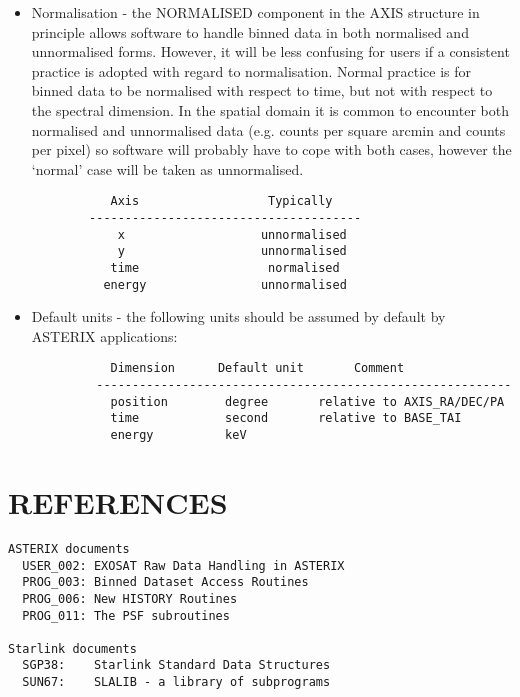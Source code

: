 \begin{itemize}
\item
Normalisation  -  the  NORMALISED  component  in   the   AXIS
structure  in principle allows software to handle binned data
in both normalised and unnormalised forms.  However, it  will
be  less  confusing  for  users  if  a consistent practice is
adopted with regard to normalisation.  Normal practice is for
binned  data  to  be normalised with respect to time, but not
with respect to  the  spectral  dimension.   In  the  spatial
domain   it  is  common  to  encounter  both  normalised  and
unnormalised data (e.g.  counts per square arcmin and  counts
per  pixel)  so software will probably have to cope with both
cases,  however  the  `normal'  case   will   be   taken   as
unnormalised.

\begin{verbatim}
           Axis                  Typically
        --------------------------------------
            x                   unnormalised
            y                   unnormalised
           time                  normalised
          energy                unnormalised
\end{verbatim}

\item
Default units - the following  units  should  be  assumed  by
default by ASTERIX applications:

\begin{verbatim}
           Dimension      Default unit       Comment
         ----------------------------------------------------------
           position        degree       relative to AXIS_RA/DEC/PA
           time            second       relative to BASE_TAI
           energy          keV     
\end{verbatim}

\end{itemize}

\section{REFERENCES}

\begin{verbatim}
ASTERIX documents
  USER_002: EXOSAT Raw Data Handling in ASTERIX
  PROG_003: Binned Dataset Access Routines
  PROG_006: New HISTORY Routines
  PROG_011: The PSF subroutines

Starlink documents
  SGP38:    Starlink Standard Data Structures
  SUN67:    SLALIB - a library of subprograms
\end{verbatim}



